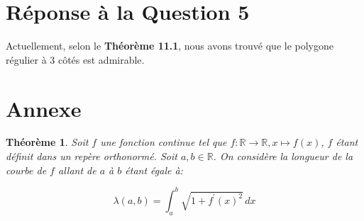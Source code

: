 \documentclass[a4paper]{amsart}
\newtheorem{theorem}{Théorème}[section]
\theoremstyle{definition}
\theoremstyle{remark}
\numberwithin{equation}{section}
\begin{document}
\section{Réponse à la Question 5}

Actuellement, selon le \textbf{Théorème 11.1}, nous avons trouvé que le polygone régulier à 3 côtés est admirable.






















































\newpage
\section{Annexe}

\begin{theorem}
  Soit $f$ une fonction continue tel que $f:\mathbb{R}\longrightarrow \mathbb{R}, x\longmapsto f(x)$, $f$ étant définit dans un repère orthonormé. Soit $a,b\in\mathbb{R}$. On considère la longueur de la courbe de $f$ allant de $a$ à $b$ étant égale à:

  \[\lambda(a,b)=\int_{a}^{b} \sqrt{1+{f^\prime}(x)^2} \,dx\]
\end{theorem}
\end{document}
